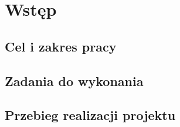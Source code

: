 \chapter{Wstęp}

\section{Cel i zakres pracy}

\section{Zadania do wykonania}

\section{Przebieg realizacji projektu}